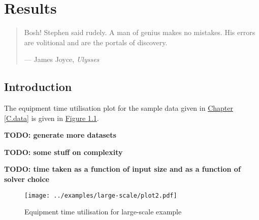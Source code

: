 %
%
%
%

\chapter{Results}\label{C.results}

\begin{quote}
Bosh! Stephen said rudely.
A man of genius makes no mistakes.
His errors are volitional and are the portals of discovery.

\hspace{2cm}--- James Joyce, \emph{Ulysses}
\end{quote}

\section{Introduction}\label{S.intro5}

The equipment time utilisation plot for the sample data given in 
\hyperref[C.data]{Chapter \ref*{C.data}} is given in
\hyperref[fig.etu]{Figure \ref*{fig.etu}}.

\textbf{TODO: generate more datasets}

\textbf{TODO: some stuff on complexity}

\textbf{TODO: time taken as a function of input size and as a function of 
    solver choice}

\newpage
\begin{figure}
    \centering
    \texttt{[image: ../examples/large-scale/plot2.pdf]}
    \caption{Equipment time utilisation for large-scale example}
    \label{fig.etu}
\end{figure}
